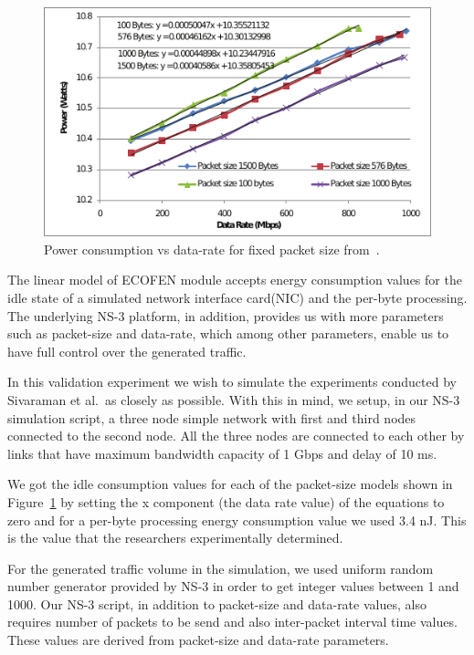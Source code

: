 \begin{figure}[ht]
	\begin{center}
		\includegraphics[width=13cm]{images/powervsdatarate1.pdf}
		\caption{Power consumption vs data-rate for fixed packet size from~\cite{Sivaraman}.}
		\label{fig:powervsdatarate1}
	\end{center}
\end{figure}

The linear model of ECOFEN module accepts energy consumption values for the idle state of a simulated network interface card(NIC) and the per-byte processing. The underlying NS-3 platform, in addition, provides us with more parameters such as packet-size and data-rate, which among other parameters, enable us to have full control over the generated traffic.

In this validation experiment we wish to simulate the experiments conducted by Sivaraman et al.~as closely as possible. With this in mind, we setup, in our NS-3 simulation script, a three node simple network with first and third nodes connected to the second node. All the three nodes are connected to each other by links that have maximum bandwidth capacity of 1 Gbps and delay of 10 ms. 

We got the idle consumption values for each of the packet-size models shown in Figure~\ref{fig:powervsdatarate1} by setting the x component (the data rate value) of the equations to zero and for a per-byte processing energy consumption value we used 3.4 nJ. This is the value that the researchers experimentally determined. 

For the generated traffic volume in the simulation, we used uniform random number generator provided by NS-3 in order to get integer values between 1 and 1000. Our NS-3 script, in addition to packet-size and data-rate values, also requires number of packets to be send and also inter-packet interval time values. These values are derived from packet-size and data-rate parameters. 

